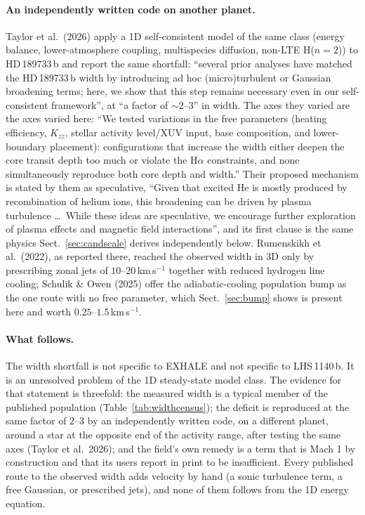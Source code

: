 \documentclass[english,a4paper]{my_memo}
\begin{document}
\paragraph{An independently written code on another planet.}
Taylor et al.\ (2026) apply a 1D self-consistent model of the same class
(energy balance, lower-atmosphere coupling, multispecies diffusion, non-LTE
H($n=2$)) to HD\,189733\,b and report the same shortfall: ``several prior
analyses have matched the HD\,189733\,b width by introducing ad hoc
(micro)turbulent or Gaussian broadening terms; here, we show that this step
remains necessary even in our self-consistent framework'', at ``a factor of
$\sim 2$--$3$'' in width. The axes they varied are the axes varied here: ``We
tested variations in the free parameters (heating efficiency, $K_{zz}$,
stellar activity level/XUV input, base composition, and lower-boundary
placement): configurations that increase the width either deepen the core
transit depth too much or violate the H$\alpha$ constraints, and none
simultaneously reproduce both core depth and width.'' Their proposed
mechanism is stated by them as speculative, ``Given that excited He is mostly
produced by recombination of helium ions, this broadening can be driven by
plasma turbulence \ldots\ While these ideas are speculative, we encourage
further exploration of plasma effects and magnetic field interactions'', and
its first clause is the same physics Sect.~\ref{sec:candscale} derives
independently below. Rumenskikh et al.\ (2022), as reported there, reached
the observed width in 3D only by prescribing zonal jets of
$10$--$20$\,km\,s$^{-1}$ together with reduced hydrogen line cooling; Schulik
\& Owen (2025) offer the adiabatic-cooling population bump as the one route
with no free parameter, which Sect.~\ref{sec:bump} shows is present here and
worth $0.25$--$1.5$\,km\,s$^{-1}$.

\paragraph{What follows.} The width shortfall is not specific to EXHALE and
not specific to LHS\,1140\,b. It is an unresolved problem of the 1D
steady-state model class. The evidence for that statement is threefold: the
measured width is a typical member of the published population
(Table~\ref{tab:widthcensus}); the deficit is reproduced at the same factor
of $2$--$3$ by an independently written code, on a different planet, around a
star at the opposite end of the activity range, after testing the same axes
(Taylor et al.\ 2026); and the field's own remedy is a term that is Mach 1 by
construction and that its users report in print to be insufficient. Every
published route to the observed width adds velocity by hand (a sonic
turbulence term, a free Gaussian, or prescribed jets), and none of them
follows from the 1D energy equation.
\end{document}

